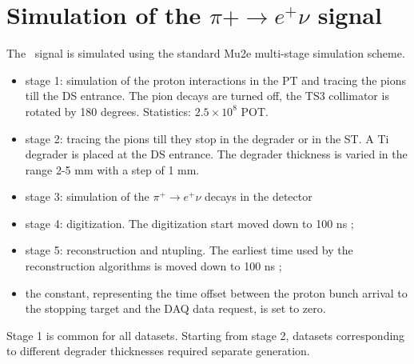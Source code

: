 \section{Simulation of the $\pi+ \to e^+ \nu $ signal }

The \piplusenu\ signal is simulated using the standard Mu2e multi-stage simulation scheme.
\begin{itemize}
\item
  stage 1: simulation of the proton interactions in the PT and tracing the pions 
  till the DS entrance. The pion decays are turned off, the TS3 collimator is rotated
  by 180 degrees. Statistics: $2.5 \times 10^8$ POT.
\item
  stage 2: tracing the pions till they stop in the degrader or in the ST. A Ti degrader is placed
  at the DS entrance. The degrader thickness is varied in the range 2-5 mm with a step of 1 mm.
\item
  stage 3: simulation of the $\pi^+ \to e^+ \nu$ decays in the detector 
\item
  stage 4: digitization. The digitization start moved down to 100 ns ;
\item
  stage 5: reconstruction and ntupling. The earliest time used by the reconstruction algorithms
  is moved down to 100 ns ;
\item
  the constant, representing the time offset between the proton bunch arrival
  to the stopping target and the DAQ data request, is set to zero.
\end{itemize}

Stage 1 is common for all datasets. Starting from stage 2, datasets corresponding
to different degrader thicknesses required separate generation.


